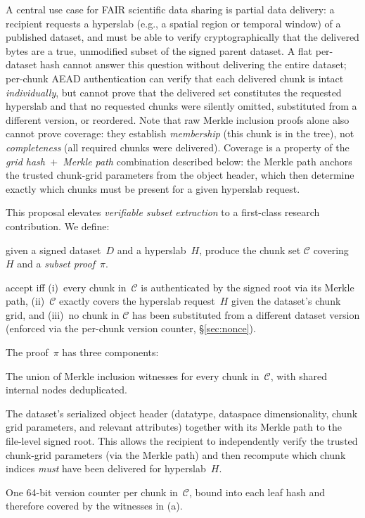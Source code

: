 \documentclass[11pt]{article}
\begin{document}
A central use case for FAIR scientific data sharing is partial data delivery:
a recipient requests a hyperslab (e.g., a spatial region or temporal window) of
a published dataset, and must be able to verify cryptographically that the
delivered bytes are a true, unmodified subset of the signed parent dataset. A
flat per-dataset hash cannot answer this question without delivering the
entire dataset; per-chunk AEAD authentication can verify that each delivered
chunk is intact \emph{individually}, but cannot prove that the delivered set
constitutes the requested hyperslab and that no requested chunks were silently
omitted, substituted from a different version, or reordered. Note that raw
Merkle inclusion proofs alone also cannot prove coverage: they establish
\emph{membership} (this chunk is in the tree), not \emph{completeness} (all
required chunks were delivered). Coverage is a property of the
\emph{grid hash~$+$~Merkle path} combination described below: the Merkle path
anchors the trusted chunk-grid parameters from the object header, which then
determine exactly which chunks must be present for a given hyperslab request.

This proposal elevates \emph{verifiable subset extraction} to a
first-class research contribution. We define:

\begin{description}[nosep]
  \item[\texttt{extract\_subset(D, H)} $\rightarrow (\mathcal{C}, \pi)$:] given
    a signed dataset~$D$ and a hyperslab~$H$, produce the chunk set
    $\mathcal{C}$ covering~$H$ and a \emph{subset proof}~$\pi$.
  \item[\texttt{verify\_subset($\mathcal{C}, H, \pi$, root)} $\rightarrow \{\bot, \top\}$:]
    accept iff (i)~every chunk in~$\mathcal{C}$ is authenticated by the signed
    root via its Merkle path, (ii)~$\mathcal{C}$ exactly covers the hyperslab
    request~$H$ given the dataset's chunk grid, and (iii)~no chunk in
    $\mathcal{C}$ has been substituted from a different dataset version
    (enforced via the per-chunk version counter, \S\ref{sec:nonce}).
\end{description}

The proof~$\pi$ has three components:
\begin{description}[nosep]
  \item[(a) Merkle witnesses.] The union of Merkle inclusion witnesses for
    every chunk in~$\mathcal{C}$, with shared internal nodes deduplicated.
  \item[(b) Coverage certificate.] The dataset's serialized object header
    (datatype, dataspace dimensionality, chunk grid parameters, and relevant
    attributes) together with its Merkle path to the file-level signed root.
    This allows the recipient to independently verify the trusted chunk-grid
    parameters (via the Merkle path) and then recompute which chunk indices
    \emph{must} have been delivered for hyperslab~$H$.
  \item[(c) Per-chunk version counters.] One 64-bit version counter per chunk
    in~$\mathcal{C}$, bound into each leaf hash and therefore covered by the
    witnesses in (a).
\end{description}
\end{document}
